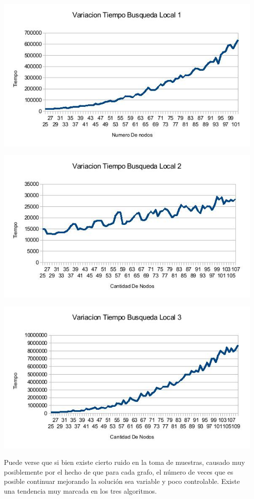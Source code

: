 \includegraphics[scale=0.5]{Ej4/tiempo1.jpg}

\includegraphics[scale=0.5]{Ej4/tiempo2.jpg}

\includegraphics[scale=0.5]{Ej4/tiempo3.jpg}

Puede verse que si bien existe cierto ruido en la toma de muestras, causado muy posiblemente por el hecho de que para cada grafo, el número de veces que es posible continuar mejorando la solución sea variable y poco controlable. Existe una tendencia muy marcada en los tres algoritmos.

